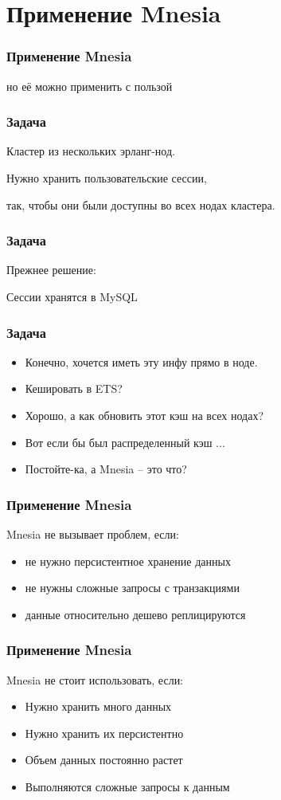 \documentclass[10pt]{beamer}
\begin{document}
\section{Применение Mnesia}

\begin{frame}
\frametitle{Применение Mnesia}
\centering
но её можно применить с пользой
\end{frame}

\begin{frame}
\frametitle{Задача}
\centering
Кластер из нескольких эрланг-нод.
\par \bigskip
Нужно хранить пользовательские сессии,
\par \bigskip
так, чтобы они были доступны во всех нодах кластера.
\end{frame}

\begin{frame}
\frametitle{Задача}
\centering
Прежнее решение:
\par \bigskip
Сессии хранятся в MySQL
\end{frame}

\begin{frame}
\frametitle{Задача}
\begin{itemize}[<+->]
\item Конечно, хочется иметь эту инфу прямо в ноде.
\item Кешировать в ETS?
\item Хорошо, а как обновить этот кэш на всех нодах?
\item Вот если бы был распределенный кэш ...
\item Постойте-ка, а Mnesia -- это что?
\end{itemize}
\end{frame}

\begin{frame}
\frametitle{Применение Mnesia}
Mnesia не вызывает проблем, если:
\begin{itemize}
\item не нужно персистентное хранение данных
\item не нужны сложные запросы с транзакциями
\item данные относительно дешево реплицируются
\end{itemize}
\end{frame}

\begin{frame}
\frametitle{Применение Mnesia}
Mnesia не стоит использовать, если:
\begin{itemize}
\item Нужно хранить много данных
\item Нужно хранить их персистентно
\item Объем данных постоянно растет
\item Выполняются сложные запросы к данным
\end{itemize}
\end{frame}
\end{document}
